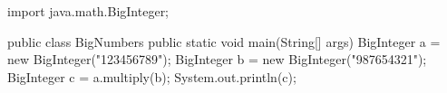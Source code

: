 \begin{unipdcode}[language=Java]
import java.math.BigInteger;

public class BigNumbers {
    public static void main(String[] args) {
        BigInteger a = new BigInteger("123456789");
        BigInteger b = new BigInteger("987654321");
        BigInteger c = a.multiply(b);
        System.out.println(c);
    }
}
\end{unipdcode}
